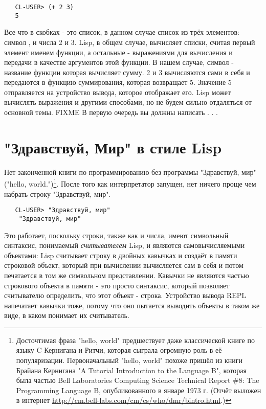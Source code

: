 \begin{verbatim}
   CL-USER> (+ 2 3)
   5
\end{verbatim}

Все что в скобках - это список, в данном случае список из трёх элементов: символ \code{+},
и числа 2 и 3. Lisp, в общем случае, вычисляет списки, считая первый элемент именем
функции, а остальные - выражениями для вычисления и передачи в качестве аргументов этой
функции. В нашем случае, символ \code{+} - название функции которая вычисляет сумму. 2 и 3
вычисляются сами в себя и передаются в функцию суммирования, которая возвращает
5. Значение 5 отправляется на устройство вывода, которое отображает его. Lisp может
вычислять выражения и другими способами, но не будем сильно отдаляться от основной
темы. FIXME В первую очередь вы должны написать . . .

\section{"Здравствуй, Мир" в стиле Lisp}

Нет законченной книги по программированию без программы "Здравствуй, мир"("hello,
world.")\footnote{Досточтимая фраза "hello, world" предшествует даже классической книге по
  языку C Кернигана и Ритчи, которая сыграла огромную роль в её
  популяризации. Первоначальный "hello, world" похоже пришёл из книги Брайана Кернигана "A
  Tutorial Introduction to the Language B", которая была частью Bell Laboratories
  Computing Science Technical Report \#8: The Programming Language B, опубликованного в
  январе 1973 г. (Отчёт выложен в интернет
  \url{http://cm.bell-labs.com/cm/cs/who/dmr/bintro.html}.) }. После того как
интерпретатор запущен, нет ничего проще чем набрать строку "Здравствуй, мир".

\begin{verbatim}
   CL-USER> "Здравствуй, мир"
    "Здравствуй, мир"
\end{verbatim}

Это работает, поскольку строки, также как и числа, имеют символьный синтаксис, понимаемый
\textit{считывателем} Lisp, и являются самовычисляемыми объектами: Lisp считывает строку в
двойных кавычках и создаёт в памяти строковой объект, который при вычислении вычисляется
сам в себя и потом печатается в том же символьном представлении. Кавычки не являются
частью строкового объекта в памяти - это просто синтаксис, который позволяет считывателю
определить, что этот объект - строка. Устройство вывода REPL напечатает кавычки тоже,
потому что оно пытается выводить объекты в таком же виде, в каком понимает их считыватель.

